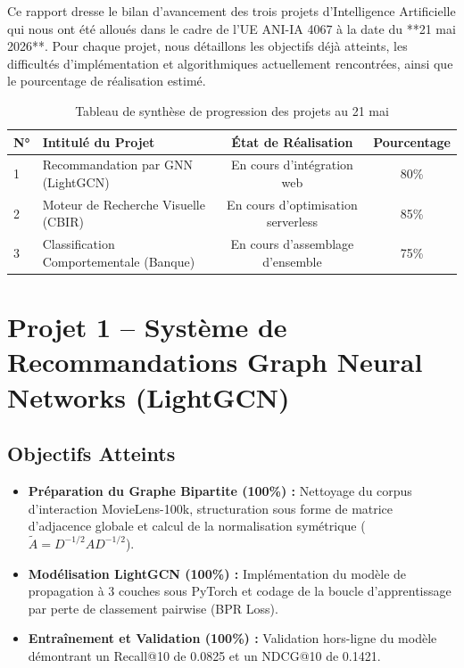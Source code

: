 \documentclass[12pt,a4paper]{article}
\begin{document}
Ce rapport dresse le bilan d'avancement des trois projets d'Intelligence Artificielle qui nous ont été alloués dans le cadre de l'UE ANI-IA 4067 à la date du **21 mai 2026**. Pour chaque projet, nous détaillons les objectifs déjà atteints, les difficultés d'implémentation et algorithmiques actuellement rencontrées, ainsi que le pourcentage de réalisation estimé.

\bigskip

\begin{table}[H]
    \centering
    \caption{Tableau de synthèse de progression des projets au 21 mai}
    \vspace{0.2cm}
    \begin{tabularx}{\linewidth}{lXcc}
        \toprule
        \textbf{N°} & \textbf{Intitulé du Projet} & \textbf{État de Réalisation} & \textbf{Pourcentage} \\
        \midrule
        1 & Recommandation par GNN (LightGCN) & En cours d'intégration web & 80\% \\
        2 & Moteur de Recherche Visuelle (CBIR) & En cours d'optimisation serverless & 85\% \\
        3 & Classification Comportementale (Banque) & En cours d'assemblage d'ensemble & 75\% \\
        \bottomrule
    \end{tabularx}
\end{table}

\newpage

\section{Projet 1 -- Système de Recommandations Graph Neural Networks (LightGCN)}

\subsection{Objectifs Atteints}
\begin{itemize}
    \item \textbf{Préparation du Graphe Bipartite (100\%) :} Nettoyage du corpus d'interaction MovieLens-100k, structuration sous forme de matrice d'adjacence globale et calcul de la normalisation symétrique ($\tilde{A} = D^{-1/2} A D^{-1/2}$).
    \item \textbf{Modélisation LightGCN (100\%) :} Implémentation du modèle de propagation à 3 couches sous PyTorch et codage de la boucle d'apprentissage par perte de classement pairwise (BPR Loss).
    \item \textbf{Entraînement et Validation (100\%) :} Validation hors-ligne du modèle démontrant un Recall@10 de 0.0825 et un NDCG@10 de 0.1421.
\end{itemize}
\end{document}
